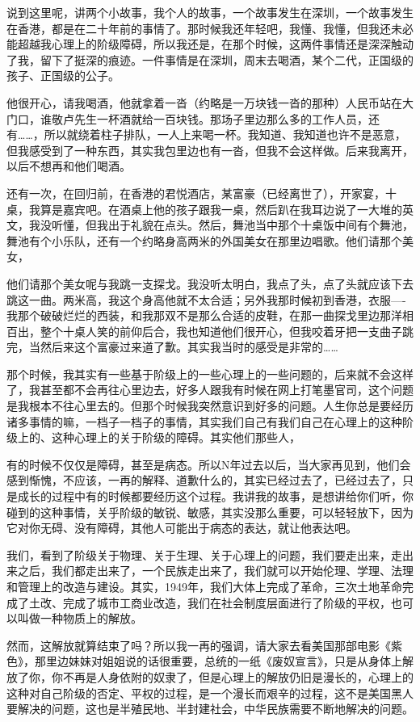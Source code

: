 \documentclass[UTF8, 12pt, a4paper]{ctexrep}
\begin{document}
说到这里呢，讲两个小故事，我个人的故事，一个故事发生在深圳，一个故事发生在香港，都是在二十年前的事情了。那时候我还年轻吧，我懂、我懂，但我还未必能超越我心理上的阶级障碍，所以我还是，在那个时候，这两件事情还是深深触动了我，留下了挺深的痕迹。一件事情是在深圳，周末去喝酒，某个二代，正国级的孩子、正国级的公子。

他很开心，请我喝酒，他就拿着一沓（约略是一万块钱一沓的那种）人民币站在大门口，谁敬卢先生一杯酒就给一百块钱。那场子里边那么多的工作人员，还有……，所以就绕着柱子排队，一人上来喝一杯。我知道、我知道也许不是恶意，但我感受到了一种东西，其实我包里边也有一沓，但我不会这样做。后来我离开，以后不想再和他们喝酒。

还有一次，在回归前，在香港的君悦酒店，某富豪（已经离世了），开家宴，十桌，我算是嘉宾吧。在酒桌上他的孩子跟我一桌，然后趴在我耳边说了一大堆的英文，我没听懂，但我出于礼貌在点头。然后，舞池当中那个十桌饭中间有个舞池，舞池有个小乐队，还有一个约略身高两米的外国美女在那里边唱歌。他们请那个美女，

他们请那个美女呢与我跳一支探戈。我没听太明白，我点了头，点了头就应该下去跳这一曲。两米高，我这个身高他就不太合适；另外我那时候初到香港，衣服----我那个破破烂烂的西装，和我那双不是那么合适的皮鞋，在那一曲探戈里边那洋相百出，整个十桌人笑的前仰后合，我也知道他们很开心，但我咬着牙把一支曲子跳完，当然后来这个富豪过来道了歉。其实我当时的感受是非常的……

那个时候，我其实有一些基于阶级上的一些心理上的一些问题的，后来就不会这样了，我甚至都不会再往心里边去，好多人跟我有时候在网上打笔墨官司，这个问题是我根本不往心里去的。但那个时候我突然意识到好多的问题。人生你总是要经历诸多事情的嘛，一档子一档子的事情，其实我们自己有我们自己在心理上的这种阶级上的、这种心理上的关于阶级的障碍。其实他们那些人，

有的时候不仅仅是障碍，甚至是病态。所以N年过去以后，当大家再见到，他们会感到惭愧，不应该，一再的解释、道歉什么的，其实已经过去了，已经过去了，只是成长的过程中有的时候都要经历这个过程。我讲我的故事，是想讲给你们听，你碰到的这种事情，关乎阶级的敏锐、敏感，其实没那么重要，可以轻轻放下，因为它对你无碍、没有障碍，其他人可能出于病态的表达，就让他表达吧。

我们，看到了阶级关于物理、关于生理、关于心理上的问题，我们要走出来，走出来之后，我们都走出来了，一个民族走出来了，我们就可以开始伦理、学理、法理和管理上的改造与建设。其实，1949年，我们大体上完成了革命，三次土地革命完成了土改、完成了城市工商业改造，我们在社会制度层面进行了阶级的平权，也可以叫做一种物质上的解放。

然而，这解放就算结束了吗？所以我一再的强调，请大家去看美国那部电影《紫色》，那里边妹妹对姐姐说的话很重要，总统的一纸《废奴宣言》，只是从身体上解放了你，你不再是人身依附的奴隶了，但是心理上的解放仍旧是漫长的，心理上的这种对自己阶级的否定、平权的过程，是一个漫长而艰辛的过程，这不是美国黑人要解决的问题，这也是半殖民地、半封建社会，中华民族需要不断地解决的问题。
\end{document}
